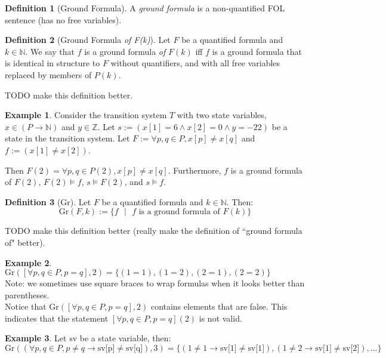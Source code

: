 \documentclass[12pt]{article}
\theoremstyle{definition}
\newtheorem{definition}{Definition}
\newtheorem{example}{Example}
\theoremstyle{remark}
\newcommand{\st}{\text{ }|\text{ }}
\newcommand{\gr}{\text{Gr}}
\begin{document}
\begin{definition}[Ground Formula]
  A \textit{ground formula} is a non-quantified FOL sentence (has no free variables).
\end{definition}

\begin{definition}[Ground Formula \textit{of F(k)}]
  Let $F$ be a quantified formula and $k \in \mathbb{N}$.  We say that $f$ is a ground formula \textit{of} $F(k)$ iff $f$ is a ground formula that is identical in structure to $F$ without quantifiers, and with all free variables replaced by members of $P(k)$.

  TODO make this definition better.
\end{definition}

\begin{example}
  Consider the transition system $T$ with two state variables, $x \in (P \to \mathbb{N})$ and $y \in \mathbb{Z}$.  Let $s := (x[1]=6 \land x[2]=0 \land y=-22)$ be a state in the transition system.  Let $F := \forall p,q \in P, x[p] \neq x[q]$ and $f := (x[1] \neq x[2])$.

  Then $F(2) = \forall p,q \in P(2), x[p] \neq x[q]$.  Furthermore, $f$ is a ground formula of $F(2)$, $F(2) \models f$, $s \models F(2)$, and $s \models f$.
\end{example}

\begin{definition}[Gr]
  Let $F$ be a quantified formula and $k \in \mathbb{N}$.  Then:
  $$\gr(F,k) := \{f \st f \text{ is a ground formula of } F(k)\}$$

  TODO make this definition better (really make the definition of ``ground formula of" better).
\end{definition}

\begin{example}
  $\gr([\forall p,q \in P, p=q],2) = \{(1=1),(1=2),(2=1),(2=2)\}$\\
  Note: we sometimes use square braces to wrap formulas when it looks better than parentheses.\\
  Notice that $\gr([\forall p,q \in P, p=q],2)$ contains elements that are false.  This indicates that the statement $[\forall p,q \in P, p=q](2)$ is not valid.
\end{example}
\begin{example}
  Let $\text{sv}$ be a state variable, then:
  $$\gr((\forall p,q \in P, p \neq q \rightarrow \text{sv[p]} \neq \text{sv[q]}),3) = \{(1 \neq 1 \rightarrow \text{sv[1]} \neq \text{sv[1]}),(1 \neq 2 \rightarrow \text{sv[1]} \neq \text{sv[2]}),...\}$$
\end{example}
\end{document}
